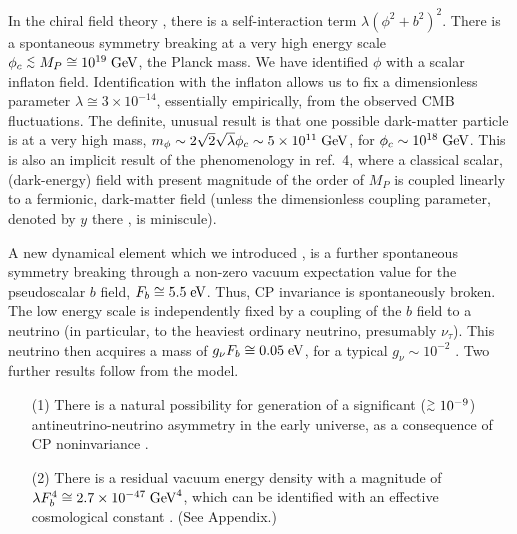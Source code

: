 In the chiral field theory \cite{ref5,ref6}, there is a self-interaction term $\lambda(\phi^2+b^2)^2$. There is
a spontaneous symmetry breaking at a very high energy scale $\phi_c\stackrel{<}{{}_\sim} M_P \cong 10^{19}\;\mbox{GeV}$, the
Planck mass. We have identified $\phi$ with a scalar inflaton field. \cite{ref1,ref2}
Identification
with the inflaton allows us to fix a dimensionless parameter $\lambda  \cong 3\times 10^{-14}$, 
essentially
empirically, \cite{ref7,ref8} from the observed CMB fluctuations. The definite, unusual 
result is that one possible dark-matter particle is at a very high mass, $m_\phi \sim 2\sqrt{2}\sqrt{\lambda}
\phi_c \sim 5\times 10^{11}\;\mbox{GeV}$, for $\phi_c\sim 10^{18}\;\mbox{GeV}$.\cite{ref2} This is also an implicit result of the phenomenology in ref.~4, where a 
classical scalar, (dark-energy) field with present magnitude of the order of $M_P$ is coupled linearly to a
fermionic, dark-matter field (unless the dimensionless coupling parameter, denoted by $y$ there \cite{ref4}, is
miniscule).

A new dynamical element which we introduced \cite{ref1}, is a further spontaneous symmetry breaking through 
a non-zero vacuum expectation value for the pseudoscalar $b$ field, $F_b\cong 5.5\;\mbox{eV}$. Thus, CP invariance is 
spontaneously broken. The low energy scale is independently fixed by a coupling of the $b$ field to a neutrino
(in particular, to the heaviest ordinary neutrino, presumably $\nu_\tau$). This neutrino then acquires a mass
of $g_\nu F_b \cong 0.05\;\mbox{eV}$, for a typical $g_\nu \sim 10^{-2}$ \cite{ref2}. Two further results follow from
the model.
\begin{itemize}
\item[(1)] There is a natural possibility for generation of a significant ($\stackrel{>}{{}_\sim} 10^{-9}$) antineutrino-neutrino
asymmetry in the early universe, as a consequence of CP noninvariance \cite{ref1}.
\item[(2)] There is a residual vacuum energy density with a magnitude of $\lambda F_b^4 \cong 2.7\times 10^{-47}\;\mbox{GeV}^4$,
which can be identified with an effective cosmological constant \cite{ref1}. (See Appendix.)
\end{itemize}

